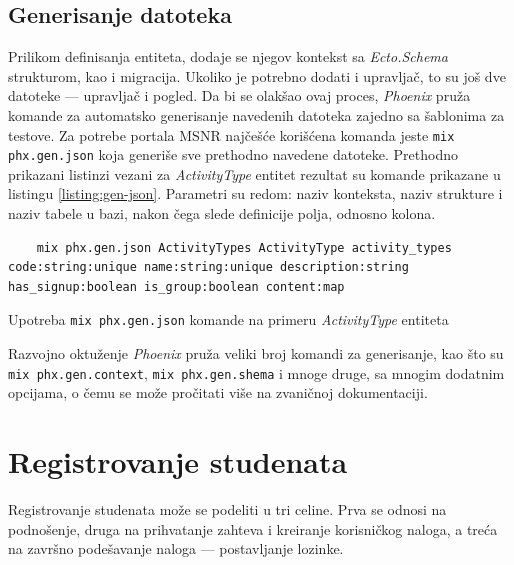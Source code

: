 \documentclass[12pt,oneside]{memoir}
\begin{document}
\subsection{Generisanje datoteka}
Prilikom definisanja entiteta, dodaje se njegov kontekst sa \emph{Ecto.Schema} strukturom, kao i migracija. 
Ukoliko je potrebno dodati i upravljač, to su još dve datoteke --- upravljač i pogled. Da bi se olakšao ovaj
proces, \emph{Phoenix} pruža komande za automatsko generisanje navedenih datoteka zajedno sa šablonima za testove.
Za potrebe portala MSNR najčešće korišćena komanda jeste \texttt{mix phx.gen.json} koja generiše sve prethodno
navedene datoteke. Prethodno prikazani listinzi vezani za \emph{ActivityType} entitet rezultat su komande prikazane u
listingu \ref{listing:gen-json}. Parametri su redom: naziv konteksta, naziv strukture i naziv tabele u bazi, nakon čega slede
definicije polja, odnosno kolona.
\begin{listing}[h]
  \begin{verbatim}
    mix phx.gen.json ActivityTypes ActivityType activity_types code:string:unique name:string:unique description:string has_signup:boolean is_group:boolean content:map
  \end{verbatim}
\caption{Upotreba \texttt{mix phx.gen.json} komande na primeru \emph{ActivityType} entiteta}
\label{listing:gen-json}
\end{listing}
Razvojno oktuženje \emph{Phoenix} pruža veliki broj komandi za generisanje, kao što su \texttt{mix phx.gen.context}, 
\texttt{mix phx.gen.shema} i mnoge druge, sa mnogim dodatnim opcijama, o čemu se može pročitati više na zvaničnoj dokumentaciji.

\section{Registrovanje studenata}
Registrovanje studenata može se podeliti u tri celine. Prva se odnosi na podnošenje, druga na prihvatanje
zahteva i kreiranje korisničkog naloga, a treća na završno podešavanje naloga --- postavljanje lozinke.
\end{document}
